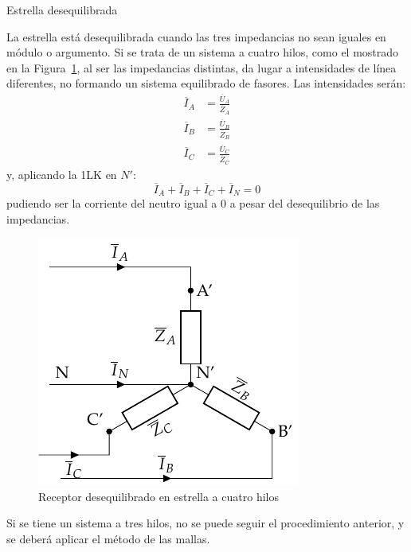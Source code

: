 \documentclass[11pt]{book} %
\makeatletter
\numberwithin{dummy}{section}
\theoremstyle{ocrenumbox}
\theoremstyle{blacknumex}
\theoremstyle{blacknumbox}
\theoremstyle{ocrenum}
\renewcommand{\subsubsection}{\@startsection {subsubsection}{3}{\z@}
{-2ex \@plus -0.1ex \@minus -.2ex}
{.2ex \@plus.2ex }
{\normalfont\small\sffamily\bfseries}}
\makeatother
\begin{document}
	\subsubsection{Estrella desequilibrada}
	
	La estrella está desequilibrada cuando las tres impedancias no sean iguales en módulo o argumento. Si se trata de un sistema a cuatro hilos, como el mostrado en la Figura~\ref{fig.estrelladeseqiulibrado_4hilos}, al ser las impedancias distintas, da lugar a intensidades de línea diferentes, no formando un sistema equilibrado de fasores. Las intensidades serán: 
	\begin{align*}
      \overline{I}_A &= \frac{\overline{U}_A}{\overline{Z}_A}\\
      \overline{I}_B &= \frac{\overline{U}_B}{\overline{Z}_B}\\
      \overline{I}_C &= \frac{\overline{U}_C}{\overline{Z}_C}
    \end{align*}
    y, aplicando la 1LK en $N'$:
    \begin{equation}
        \overline{I}_A  + \overline{I}_B + \overline{I}_C + \overline{I}_N = 0
    \end{equation}
	pudiendo ser la corriente del neutro igual a 0 a pesar del desequilibrio de las impedancias. 
	
	\begin{figure}
	    \centering
	    \includegraphics{../figs/EstrellaDesequilibrado_Receptor.pdf}
	    \caption{Receptor desequilibrado en estrella a cuatro hilos}
	    \label{fig.estrelladeseqiulibrado_4hilos}
	\end{figure}
	
	Si se tiene un sistema a tres hilos, no se puede seguir el procedimiento anterior, y se deberá aplicar el método de las mallas. 
	
\end{document}
